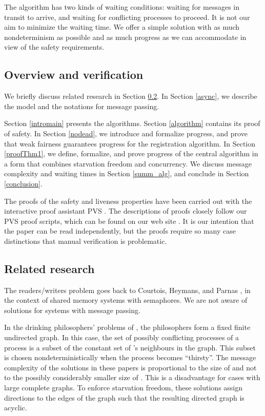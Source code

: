 \documentclass[10pt]{article} \usepackage[english]{babel}
\begin{document}
The algorithm has two kinds of waiting conditions: waiting for
messages in transit to arrive, and waiting for conflicting processes
to proceed.  It is not our aim to minimize the waiting time.  We offer
a simple solution with as much nondeterminism as possible and as much
progress as we can accommodate in view of the safety requirements.

\subsection{Overview and verification}

We briefly discuss related research in Section \ref{relatedresearch}.
In Section \ref{async}, we describe the model and the notations for
message passing. 

Section \ref{intromain} presents the algorithms.  Section
\ref{algorithm} contains its proof of safety.  In Section
\ref{nodead}, we introduce and formalize progress, and prove that weak
fairness guarantees progress for the registration algorithm.  In
Section \ref{proofThm1}, we define, formalize, and prove progress of
the central algorithm in a form that combines starvation freedom and
concurrency.  We discuss message complexity and waiting times in
Section \ref{summ_alg}, and conclude in Section \ref {conclusion}.

The proofs of the safety and liveness properties have been carried out
with the interactive proof assistant PVS \cite{OSR01}.  The
descriptions of proofs closely follow our PVS proof scripts, which can
be found on our web site \cite{whh_distrRscAlloc}.  It is our
intention that the paper can be read independently, but the proofs
require so many case distinctions that manual verification is
problematic.


\subsection{Related research} \label{relatedresearch}

The readers/writers problem \cite{And00} goes back to Courtois,
Heymans, and Parnas \cite{CHP71}, in the context of shared memory
systems with semaphores.  We are not aware of solutions for systems
with message passing.

In the drinking philosophers' problems of \cite{ChM84,Lyn96,WeL93},
the philosophers form a fixed finite undirected graph.  In this case,
the set  of possibly conflicting processes of a process 
is a subset of the constant set  of 's neighbours in the
graph.  This subset is chosen nondeterministically when the process
becomes ``thirsty''. The message complexity of the solutions in these
papers is proportional to the size of  and not to the
possibly considerably smaller size of .  This is a
disadvantage for cases with large complete graphs. To enforce
starvation freedom, these solutions assign directions to the edges of
the graph such that the resulting directed graph is acyclic.
\end{document}
